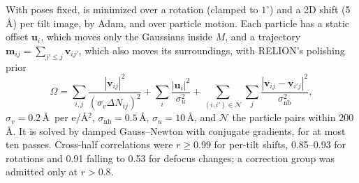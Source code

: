 With poses fixed,  is minimized over a rotation (clamped to $1^\circ$) and a 2D shift (5\,\AA) per tilt image, by Adam, and over particle motion.
Each particle has a static offset $\mathbf{u}_i$, which moves only the Gaussians inside $M$, and a trajectory $\mathbf{m}_{ij}=\sum_{j'\le j}\mathbf{v}_{ij'}$, which also moves its surroundings, with RELION's polishing prior~\cite{zivanov2019polishing}
\begin{equation}
\Omega=\sum_{i,j}\frac{|\mathbf{v}_{ij}|^2}{(\sigma_v\Delta N_{ij})^2}+\sum_i\frac{|\mathbf{u}_i|^2}{\sigma_u^2}+\sum_{(i,i')\in\mathcal{N}}\sum_{j}\frac{|\mathbf{v}_{ij}-\mathbf{v}_{i'j}|^2}{\sigma_{\mathrm{nb}}^2},
\label{eq:motion}
\end{equation}
$\sigma_v=0.2$\,\AA\ per e/\AA$^2$, $\sigma_{\mathrm{nb}}=0.5$\,\AA, $\sigma_u=10$\,\AA, and $\mathcal{N}$ the particle pairs within 200\,\AA.
It is solved by damped Gauss--Newton with conjugate gradients, for at most ten passes.
Cross-half correlations were $r\ge0.99$ for per-tilt shifts, 0.85--0.93 for rotations and 0.91 falling to 0.53 for defocus changes; a correction group was admitted only at $r>0.8$.
